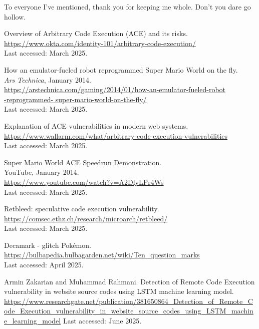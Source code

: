 \documentclass[a4paper]{usiinfbachelorproject}
\begin{document}
To everyone I've mentioned, thank you for keeping me whole. Don't you dare go hollow.

\newpage



\begin{thebibliography}{99}

	Overview of Arbitrary Code Execution (ACE) and its risks.\\
	\url{https://www.okta.com/identity-101/arbitrary-code-execution/}\\
	Last accessed: March 2025.

	How an emulator-fueled robot reprogrammed Super Mario World on the fly.\\
	\textit{Ars Technica}, January 2014.\\
	\url{https://arstechnica.com/gaming/2014/01/how-an-emulator-fueled-robot}
	\\\url{-reprogrammed-
		super-mario-world-on-the-fly/}\\
	Last accessed: March 2025.



	Explanation of ACE vulnerabilities in modern web systems.\\
	\url{https://www.wallarm.com/what/arbitrary-code-execution-vulnerabilities}\\
	Last accessed: March 2025.

	Super Mario World ACE Speedrun Demonstration.\\
	YouTube, January 2014.\\
	\url{https://www.youtube.com/watch?v=A2DlyLPr4Ws} \\
	Last accessed: March 2025.



	Retbleed: speculative code execution vulnerability.\\
	\url{https://comsec.ethz.ch/research/microarch/retbleed/}\\
	Last accessed: March 2025.

	Decamark - glitch Pokémon.\\
	\url{https://bulbapedia.bulbagarden.net/wiki/Ten_question_marks}  \\
	Last accessed: April 2025.



	Armin Zakarian and Muhammad Rahmani.
	Detection of Remote Code Execution vulnerability in website source codes using LSTM machine learning model.
	\url{https://www.researchgate.net/publication/381650864_Detection_of_Remote_Code_Execution_vulnerability_in_website_source_codes_using_LSTM_machine_learning_model}
	Last accessed: June 2025.


\end{thebibliography}
\end{document}
